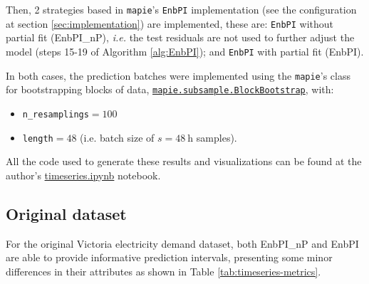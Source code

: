 Then, 2 strategies based in \texttt{mapie}'s \texttt{EnbPI} implementation (see the configuration at section \ref{sec:implementation}) are implemented, these are: \texttt{EnbPI} without partial fit (EnbPI\_{}nP), \textit{i.e.} the test residuals are not used to further adjust the model (steps 15-19 of Algorithm \ref{alg:EnbPI}); and \texttt{EnbPI} with partial fit (EnbPI).

In both cases, the prediction batches were implemented using the \texttt{mapie}'s class for bootstrapping blocks of data, \href{https://mapie.readthedocs.io/en/latest/generated/mapie.subsample.BlockBootstrap.html}{\texttt{mapie.subsample.BlockBootstrap}}, with:
\begin{itemize}
    \setlength{\itemsep}{0pt}
    \item \texttt{n\_{}resamplings}$=100$
    \item \texttt{length}$=48$ (i.e. batch size of $s=48\ \mathrm{h}$ samples).
\end{itemize}

All the code used to generate these results and visualizations can be found at the author's \href{https://github.com/gcastro-98/conformal-prediction/blob/main/timeseries.ipynb}{timeseries.ipynb} notebook.

\subsection{Original dataset}\label{subsec:timeseries-original}

For the original Victoria electricity demand dataset, both EnbPI\_{}nP and EnbPI are able to provide informative prediction intervals, presenting some minor differences in their attributes as shown in Table \ref{tab:timeseries-metrics}.

